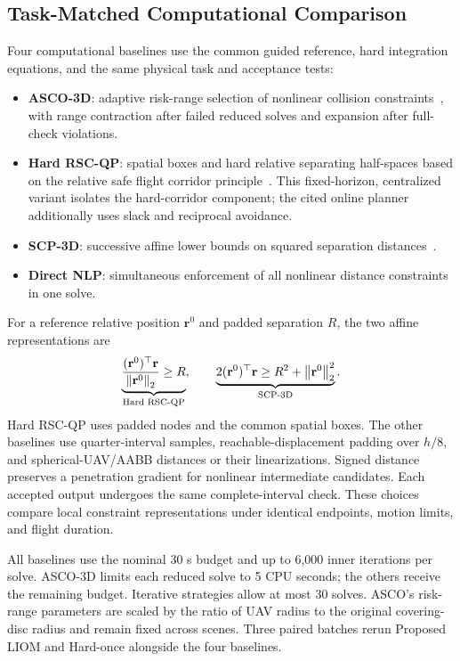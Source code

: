 \subsection{Task-Matched Computational Comparison}
\label{sec:external}
Four computational baselines use the common guided reference, hard integration equations, and the same physical task and acceptance tests:
\begin{samepage}
\begin{itemize}
\item \textbf{ASCO-3D}: adaptive risk-range selection of nonlinear collision constraints~\cite{li2021asco}, with range contraction after failed reduced solves and expansion after full-check violations.
\item \textbf{Hard RSC-QP}: spatial boxes and hard relative separating half-spaces based on the relative safe flight corridor principle~\cite{park2021}. This fixed-horizon, centralized variant isolates the hard-corridor component; the cited online planner additionally uses slack and reciprocal avoidance.
\item \textbf{SCP-3D}: successive affine lower bounds on squared separation distances~\cite{augugliaro2012}.
\item \textbf{Direct NLP}: simultaneous enforcement of all nonlinear distance constraints in one solve.
\end{itemize}
\par\end{samepage}
For a reference relative position $\mathbf r^0$ and padded separation $R$, the two affine representations are
\begin{equation}
 \underbrace{\frac{(\mathbf r^0)^\top\mathbf r}{\left\lVert \mathbf r^0\right\rVert_2}\geq R}_{\text{Hard RSC-QP}},\qquad
 \underbrace{2(\mathbf r^0)^\top\mathbf r\geq R^2+\left\lVert \mathbf r^0\right\rVert_2^2}_{\text{SCP-3D}}.
 \label{eq:baseline-separation}
\end{equation}
Hard RSC-QP uses padded nodes and the common spatial boxes. The other baselines use quarter-interval samples, reachable-displacement padding over $h/8$, and spherical-UAV/AABB distances or their linearizations. Signed distance preserves a penetration gradient for nonlinear intermediate candidates. Each accepted output undergoes the same complete-interval check. These choices compare local constraint representations under identical endpoints, motion limits, and flight duration.

All baselines use the nominal 30 s budget and up to 6,000 inner iterations per solve. ASCO-3D limits each reduced solve to 5 CPU seconds; the others receive the remaining budget. Iterative strategies allow at most 30 solves. ASCO's risk-range parameters are scaled by the ratio of UAV radius to the original covering-disc radius and remain fixed across scenes. Three paired batches rerun Proposed LIOM and Hard-once alongside the four baselines.

